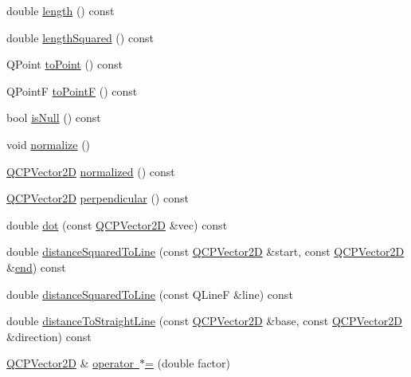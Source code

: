 \begin{DoxyCompactItemize}
\item 
double \mbox{\hyperlink{class_q_c_p_vector2_d_a10adb5ab031fe94f0b64a3c5aefb552e}{length}} () const
\item 
double \mbox{\hyperlink{class_q_c_p_vector2_d_a766585459d84cb149334fda1a498b2e5}{length\+Squared}} () const
\item 
Q\+Point \mbox{\hyperlink{class_q_c_p_vector2_d_add3edf75de9b7bf1abc693b973b2e906}{to\+Point}} () const
\item 
Q\+PointF \mbox{\hyperlink{class_q_c_p_vector2_d_acd7af3f4a62833ada58be3f3021dbbac}{to\+PointF}} () const
\item 
bool \mbox{\hyperlink{class_q_c_p_vector2_d_ace99f200b347b14864808213eef16593}{is\+Null}} () const
\item 
void \mbox{\hyperlink{class_q_c_p_vector2_d_ad83268be370685c2a0630acc0fb1a425}{normalize}} ()
\item 
\mbox{\hyperlink{class_q_c_p_vector2_d}{Q\+C\+P\+Vector2D}} \mbox{\hyperlink{class_q_c_p_vector2_d_a707bb3af3b1f9331a2450ec75eaf7eb0}{normalized}} () const
\item 
\mbox{\hyperlink{class_q_c_p_vector2_d}{Q\+C\+P\+Vector2D}} \mbox{\hyperlink{class_q_c_p_vector2_d_a0e08d09f9027784237e302e32290b001}{perpendicular}} () const
\item 
double \mbox{\hyperlink{class_q_c_p_vector2_d_a39f8d28db7dbffcca6aa63a1f1f6e176}{dot}} (const \mbox{\hyperlink{class_q_c_p_vector2_d}{Q\+C\+P\+Vector2D}} \&vec) const
\item 
double \mbox{\hyperlink{class_q_c_p_vector2_d_a14840cd3da80cfee4eb3f8977cab89ab}{distance\+Squared\+To\+Line}} (const \mbox{\hyperlink{class_q_c_p_vector2_d}{Q\+C\+P\+Vector2D}} \&start, const \mbox{\hyperlink{class_q_c_p_vector2_d}{Q\+C\+P\+Vector2D}} \&\mbox{\hyperlink{myutils_8h_a64d77caddefed4b96fa62e3f5f73c9a2}{end}}) const
\item 
double \mbox{\hyperlink{class_q_c_p_vector2_d_a0c44ca97d46ee04feec32c1c57e70831}{distance\+Squared\+To\+Line}} (const Q\+LineF \&line) const
\item 
double \mbox{\hyperlink{class_q_c_p_vector2_d_ae240b845c3744e43a5d0aa7b2bb66c19}{distance\+To\+Straight\+Line}} (const \mbox{\hyperlink{class_q_c_p_vector2_d}{Q\+C\+P\+Vector2D}} \&base, const \mbox{\hyperlink{class_q_c_p_vector2_d}{Q\+C\+P\+Vector2D}} \&direction) const
\item 
\mbox{\hyperlink{class_q_c_p_vector2_d}{Q\+C\+P\+Vector2D}} \& \mbox{\hyperlink{class_q_c_p_vector2_d_a079f1159ca74168b52904392a7bf304c}{operator $\ast$=}} (double factor)

\end{DoxyCompactItemize}
